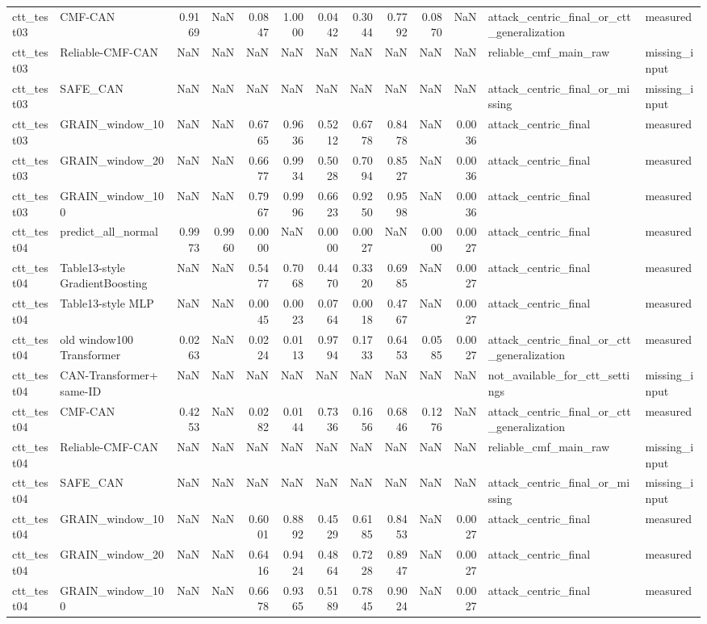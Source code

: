 \begin{tabular}{llrrrrrrrrrll}
ctt_test03 & CMF-CAN & 0.9169 & NaN & 0.0847 & 1.0000 & 0.0442 & 0.3044 & 0.7792 & 0.0870 & NaN & attack_centric_final_or_ctt_generalization & measured \\
ctt_test03 & Reliable-CMF-CAN & NaN & NaN & NaN & NaN & NaN & NaN & NaN & NaN & NaN & reliable_cmf_main_raw & missing_input \\
ctt_test03 & SAFE_CAN & NaN & NaN & NaN & NaN & NaN & NaN & NaN & NaN & NaN & attack_centric_final_or_missing & missing_input \\
ctt_test03 & GRAIN_window_10 & NaN & NaN & 0.6765 & 0.9636 & 0.5212 & 0.6778 & 0.8478 & NaN & 0.0036 & attack_centric_final & measured \\
ctt_test03 & GRAIN_window_20 & NaN & NaN & 0.6677 & 0.9934 & 0.5028 & 0.7094 & 0.8527 & NaN & 0.0036 & attack_centric_final & measured \\
ctt_test03 & GRAIN_window_100 & NaN & NaN & 0.7967 & 0.9996 & 0.6623 & 0.9250 & 0.9598 & NaN & 0.0036 & attack_centric_final & measured \\
ctt_test04 & predict_all_normal & 0.9973 & 0.9960 & 0.0000 & NaN & 0.0000 & 0.0027 & NaN & 0.0000 & 0.0027 & attack_centric_final & measured \\
ctt_test04 & Table13-style GradientBoosting & NaN & NaN & 0.5477 & 0.7068 & 0.4470 & 0.3320 & 0.6985 & NaN & 0.0027 & attack_centric_final & measured \\
ctt_test04 & Table13-style MLP & NaN & NaN & 0.0045 & 0.0023 & 0.0764 & 0.0018 & 0.4767 & NaN & 0.0027 & attack_centric_final & measured \\
ctt_test04 & old window100 Transformer & 0.0263 & NaN & 0.0224 & 0.0113 & 0.9794 & 0.1733 & 0.6453 & 0.0585 & 0.0027 & attack_centric_final_or_ctt_generalization & measured \\
ctt_test04 & CAN-Transformer+ same-ID & NaN & NaN & NaN & NaN & NaN & NaN & NaN & NaN & NaN & not_available_for_ctt_settings & missing_input \\
ctt_test04 & CMF-CAN & 0.4253 & NaN & 0.0282 & 0.0144 & 0.7336 & 0.1656 & 0.6846 & 0.1276 & NaN & attack_centric_final_or_ctt_generalization & measured \\
ctt_test04 & Reliable-CMF-CAN & NaN & NaN & NaN & NaN & NaN & NaN & NaN & NaN & NaN & reliable_cmf_main_raw & missing_input \\
ctt_test04 & SAFE_CAN & NaN & NaN & NaN & NaN & NaN & NaN & NaN & NaN & NaN & attack_centric_final_or_missing & missing_input \\
ctt_test04 & GRAIN_window_10 & NaN & NaN & 0.6001 & 0.8892 & 0.4529 & 0.6185 & 0.8453 & NaN & 0.0027 & attack_centric_final & measured \\
ctt_test04 & GRAIN_window_20 & NaN & NaN & 0.6416 & 0.9424 & 0.4864 & 0.7228 & 0.8947 & NaN & 0.0027 & attack_centric_final & measured \\
ctt_test04 & GRAIN_window_100 & NaN & NaN & 0.6678 & 0.9365 & 0.5189 & 0.7845 & 0.9024 & NaN & 0.0027 & attack_centric_final & measured \\
\bottomrule
\end{tabular}

